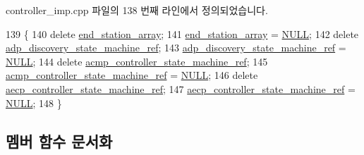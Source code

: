 controller\+\_\+imp.\+cpp 파일의 138 번째 라인에서 정의되었습니다.


\begin{DoxyCode}
139 \{
140     \textcolor{keyword}{delete} \hyperlink{classavdecc__lib_1_1controller__imp_a17c6518dbb728acdcd1c4e78d7bc1c5a}{end\_station\_array};
141     \hyperlink{classavdecc__lib_1_1controller__imp_a17c6518dbb728acdcd1c4e78d7bc1c5a}{end\_station\_array} = \hyperlink{openavb__types__base__pub_8h_a070d2ce7b6bb7e5c05602aa8c308d0c4}{NULL};
142     \textcolor{keyword}{delete} \hyperlink{namespaceavdecc__lib_aa33697f1203280924134bb7fdcc76129}{adp\_discovery\_state\_machine\_ref};
143     \hyperlink{namespaceavdecc__lib_aa33697f1203280924134bb7fdcc76129}{adp\_discovery\_state\_machine\_ref} = \hyperlink{openavb__types__base__pub_8h_a070d2ce7b6bb7e5c05602aa8c308d0c4}{NULL};
144     \textcolor{keyword}{delete} \hyperlink{namespaceavdecc__lib_a693c2049de1d4ec860a92126b846ac21}{acmp\_controller\_state\_machine\_ref};
145     \hyperlink{namespaceavdecc__lib_a693c2049de1d4ec860a92126b846ac21}{acmp\_controller\_state\_machine\_ref} = \hyperlink{openavb__types__base__pub_8h_a070d2ce7b6bb7e5c05602aa8c308d0c4}{NULL};
146     \textcolor{keyword}{delete} \hyperlink{namespaceavdecc__lib_a0b1b5aea3c0490f77cbfd9178af5be22}{aecp\_controller\_state\_machine\_ref};
147     \hyperlink{namespaceavdecc__lib_a0b1b5aea3c0490f77cbfd9178af5be22}{aecp\_controller\_state\_machine\_ref} = \hyperlink{openavb__types__base__pub_8h_a070d2ce7b6bb7e5c05602aa8c308d0c4}{NULL};
148 \}
\end{DoxyCode}


\subsection{멤버 함수 문서화}
